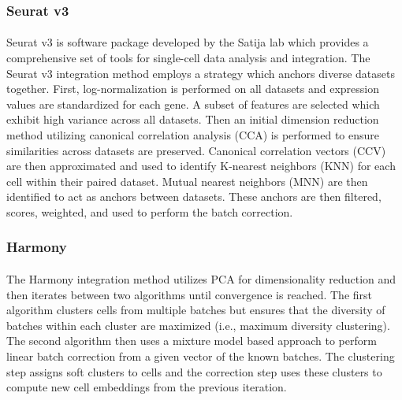 \documentclass[
12pt, %
letterpaper, %
oneside, %
headinclude,footinclude, %
BCOR5mm, %
]{scrartcl}
\begin{document}
\subsubsection*{Seurat v3}

\paragraph*{}
Seurat v3 \citep{stuart2019comprehensive} is software package developed by the Satija lab which provides a comprehensive set of tools for single-cell data analysis and integration. The Seurat v3 integration method employs a strategy which anchors diverse datasets together. First, log-normalization is performed on all datasets and expression values are standardized for each gene. A subset of features are selected which exhibit high variance across all datasets. Then an initial dimension reduction method utilizing canonical correlation analysis (CCA) is performed to ensure similarities across datasets are preserved. Canonical correlation vectors (CCV) are then approximated and used to identify K-nearest neighbors (KNN) for each cell within their paired dataset. Mutual nearest neighbors (MNN) are then identified to act as anchors between datasets. These anchors are then filtered, scores, weighted, and used to perform the batch correction.

\subsubsection*{Harmony}

\paragraph*{}
The Harmony integration method \citep{korsunsky2019fast} utilizes PCA for dimensionality reduction and then iterates between two algorithms until convergence is reached. The first algorithm clusters cells from multiple batches but ensures that the diversity of batches within each cluster are maximized (i.e., maximum diversity clustering). The second algorithm then uses a mixture model based approach to perform linear batch correction from a given vector of the known batches. The clustering step assigns soft clusters to cells and the correction step uses these clusters to compute new cell embeddings from the previous iteration.

\end{document}
